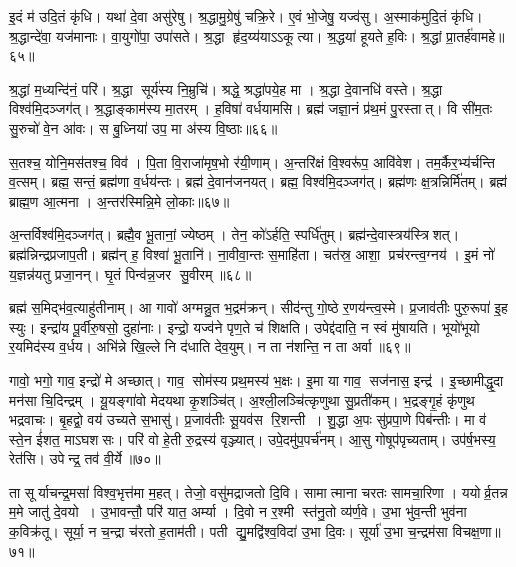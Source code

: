 इ॒दं म॑ उदि॒तं कृ॑धि।
यथा॑ दे॒वा असु॑रेषु।
श्र॒द्धामु॒ग्रेषु॑ चक्रि॒रे।
ए॒वं भो॒जेषु॒ यज्व॑सु।
अ॒स्माक॑मुदि॒तं कृ॑धि।
श्र॒द्धान्दे॑वा॒ यज॑मानाः।
वा॒युगो॑पा॒ उपा॑सते।
श्र॒द्धा हृ॑द॒य्य॑याऽऽकूत्या।
श्र॒द्धया॑ हूयते ह॒विः।
श्र॒द्धां प्रा॒तर्\mbox{}ह॑वामहे॥६५॥

श्र॒द्धां म॒ध्यन्दि॑नं॒ परि॑।
श्र॒द्धा सूर्य॑स्य नि॒म्रुचि॑।
श्रद्धे॒ श्रद्धा॑पये॒ह मा।
श्र॒द्धा दे॒वानधि॑ वस्ते।
श्र॒द्धा विश्व॑मि॒दञ्जग॑त्।
श्र॒द्धाङ्काम॑स्य मा॒तरम्।
ह॒विषा॑ वर्धयामसि।
ब्रह्म॑ जज्ञा॒नं प्र॑थ॒मं पु॒रस्तात्।
वि सी॑म॒तः सु॒रुचो॑ वे॒न आ॑वः।
स बु॒ध्निया॑ उप॒ मा अ॑स्य वि॒ष्ठाः॥६६॥

स॒तश्च॒ योनि॒मस॑तश्च॒ विव॑।
पि॒ता वि॒राजा॑मृष॒भो र॑यी॒णाम्।
अ॒न्तरि॑क्षं वि॒श्वरू॑प॒ आवि॑वेश।
तम॒र्कैर॒भ्य॑र्चन्ति व॒त्सम्।
ब्रह्म॒ सन्तं॒ ब्रह्म॑णा व॒र्धय॑न्तः।
ब्रह्म॑ दे॒वान॑जनयत्।
ब्रह्म॒ विश्व॑मि॒दञ्जग॑त्।
ब्रह्म॑णः क्ष॒त्रन्निर्मि॑तम्।
ब्रह्म॑ ब्राह्म॒ण आ॒त्मना।
अ॒न्तर॑स्मिन्नि॒मे लो॒काः॥६७॥

अ॒न्तर्विश्व॑मि॒दञ्जग॑त्।
ब्रह्मै॒व भू॒तानां॒ ज्येष्ठम्।
तेन॒ को॑ऽर्\mbox{}हति॒ स्पर्धि॑तुम्।
ब्रह्म॑न्दे॒वास्त्रय॑स्त्रिशत्।
ब्रह्म॑न्निन्द्रप्रजाप॒ती।
ब्रह्म॑न् ह॒ विश्वा॑ भू॒तानि॑।
ना॒वीवा॒न्तः स॒माहि॑ता।
चत॑स्र॒ आशा॒ प्रच॑रन्त्व॒ग्नय॑।
इ॒मं नो॑ य॒ज्ञन्न॑यतु प्रजा॒नन्।
घृ॒तं पिन्व॑न्न॒जर सु॒वीरम्॥६८॥

ब्रह्म॑ स॒मिद्भ॑व॒त्याहु॑तीनाम्।
आ गावो॑ अग्मन्नु॒त भ॒द्रम॑क्रन्।
सीद॑न्तु गो॒ष्ठे र॒णय॑न्त्व॒स्मे।
प्र॒जाव॑तीः पुरु॒रूपा॑ इ॒ह स्युः।
इन्द्रा॑य पू॒र्वीरु॒षसो॒ दुहा॑नाः।
इन्द्रो॒ यज्व॑ने पृण॒ते च॑ शिक्षति।
उपेद्द॑दाति॒ न स्वं मु॑षायति।
भूयो॑भूयो र॒यमिद॑स्य व॒र्धय\sn{}।
अभि॑न्ने खि॒ल्ले नि द॑धाति देव॒युम्।
न ता न॑शन्ति॒ न ता अर्वा॥६९॥

गावो॒ भगो॒ गाव॒ इन्द्रो॑ मे अच्छात्।
गाव॒ सोम॑स्य प्रथ॒मस्य॑ भ॒क्षः।
इ॒मा या गाव॒ सज॑नास॒ इन्द्र॑।
इ॒च्छामीद्धृ॒दा मन॑सा चि॒दिन्द्रम्।
यू॒यङ्गा॑वो मेदयथा कृ॒शञ्चि॑त्।
अ॒श्ली॒लञ्चि॑त्कृणुथा सु॒प्रती॑कम्।
भ॒द्रङ्गृ॒हं कृ॑णुथ भद्रवाचः।
बृ॒हद्वो॒ वय॑ उच्यते स॒भासु॑।
प्र॒जाव॑तीः सू॒यव॑स रि॒शन्ती।
शु॒द्धा अ॒पः सु॑प्रपा॒णे पिब॑न्तीः।
मा व॑ स्ते॒न ई॑शत॒ माऽघशसः।
परि॑ वो हे॒ती रु॒द्रस्य॑ वृञ्ज्यात्।
उपे॒दमु॑प॒पर्च॑नम्।
आ॒सु गोषूप॑पृच्यताम्।
उप॑र्\mbox{}ष॒भस्य॒ रेत॑सि।
उपेन्द्र॒ तव॑ वी॒र्ये॥७०॥\anuvakamend[च॒रा॒मि॒ कनी॑यो॒ऽन्यानर्पि॑ता प॒दानि॒ यज्व॑सु हवामहे वि॒ष्ठा लो॒काः सु॒वीर॒मर्वा॒ पिब॑न्ती॒ष्षट्च॑]

ता सूर्याचन्द्र॒मसा॑ विश्व॒भृत्त॑मा म॒हत्।
तेजो॒ वसु॑मद्राजतो दि॒वि।
सामात्माना चरतः सामचा॒रिणा।
ययोर्व्र॒तन्न म॒मे जातु॑ दे॒वयो।
उ॒भावन्तौ॒ परि॑ यात॒ अर्म्या।
दि॒वो न र॒श्मी स्त॑नु॒तो व्य॑र्ण॒वे।
उ॒भा भु॑व॒न्ती भुव॑ना क॒विक्र॑तू।
सूर्या॒ न च॒न्द्रा च॑रतो ह॒ताम॑ती।
पती द्यु॒मद्वि॑श्व॒विदा॑ उ॒भा दि॒वः।
सूर्या॑ उ॒भा च॒न्द्रम॑सा विचक्ष॒णा॥७१॥

